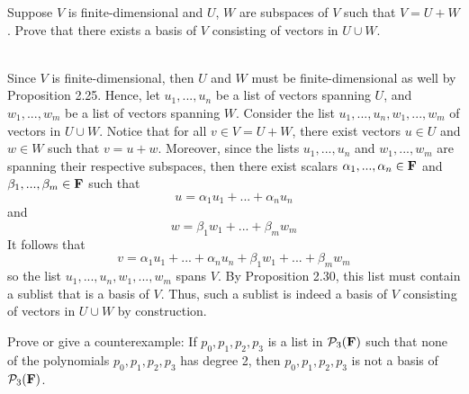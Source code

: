 \begin{exercise}
    Suppose $V$ is finite-dimensional and $U$, $W$ are subspaces of $V$ such that $V = U + W$. Prove that there exists a basis of $V$ consisting of vectors in $U \cup W$. \\
\end{exercise}

\begin{solution}
    \\ Since $V$ is finite-dimensional, then $U$ and $W$ must  be finite-dimensional as well by Proposition 2.25. Hence, let $u_1, ..., u_n$ be a list of vectors spanning $U$, and $w_1, ..., w_m$ be a list of vectors spanning $W$. Consider the list $u_1, ..., u_n, w_1, ..., w_m$ of vectors in $U \cup W$. Notice that for all $v \in V = U+W$, there exist vectors $u \in U$ and $w \in W$ such that $v = u+ w$. Moreover, since the lists $u_1, ..., u_n$ and $w_1, ..., w_m$ are spanning their respective subspaces, then there exist scalars $\alpha_1, ..., \alpha_n \in \mathbf{F}$ and $\beta_1, ..., \beta_m \in \mathbf{F}$ such that 
    $$u = \alpha_1 u_1 + ... + \alpha_n u_n$$
    and 
    $$w = \beta_1 w_1 + ... + \beta_m w_m$$
    It follows that
    $$v = \alpha_1 u_1 + ... + \alpha_n u_n + \beta_1 w_1 + ... + \beta_m w_m$$ 
    so the list $u_1, ..., u_n, w_1, ..., w_m$ spans $V$. By Proposition 2.30, this list must contain a sublist that is a basis of $V$. Thus, such a sublist is indeed a basis of $V$ consisting of vectors in $U \cup W$ by construction.\\
\end{solution}

\begin{exercise}
    Prove or give a counterexample: If $p_0, p_1, p_2, p_3$ is a list in $\mathcal{P}_3(\mathbf{F})$ such that none of the polynomials $p_0, p_1, p_2, p_3$ has degree 2, then $p_0, p_1, p_2, p_3$ is not a basis of $\mathcal{P}_3(\mathbf{F})$. \\
\end{exercise}

